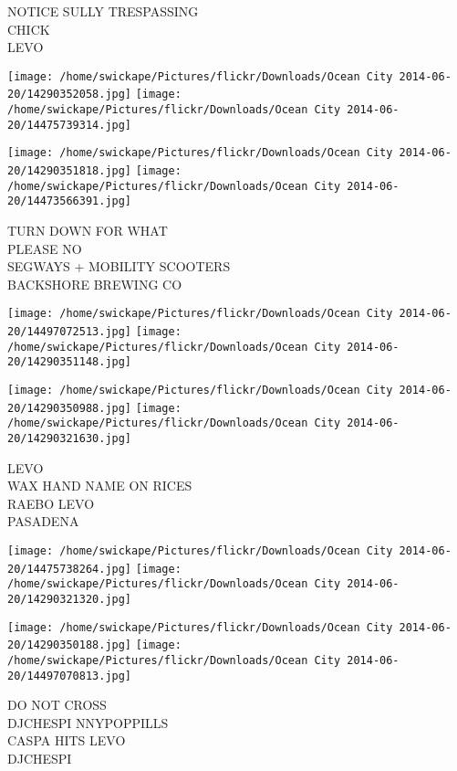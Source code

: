 \documentclass[10pt,letterpaper]{article}
\begin{document}
NOTICE SULLY TRESPASSING\\
CHICK\\
LEVO\\
\pagebreak

\texttt{[image: /home/swickape/Pictures/flickr/Downloads/Ocean City 2014-06-20/14290352058.jpg]}
\texttt{[image: /home/swickape/Pictures/flickr/Downloads/Ocean City 2014-06-20/14475739314.jpg]}

\texttt{[image: /home/swickape/Pictures/flickr/Downloads/Ocean City 2014-06-20/14290351818.jpg]}
\texttt{[image: /home/swickape/Pictures/flickr/Downloads/Ocean City 2014-06-20/14473566391.jpg]}

TURN DOWN FOR WHAT\\
PLEASE NO\\
SEGWAYS + MOBILITY SCOOTERS\\
BACKSHORE BREWING CO\\
\pagebreak

\texttt{[image: /home/swickape/Pictures/flickr/Downloads/Ocean City 2014-06-20/14497072513.jpg]}
\texttt{[image: /home/swickape/Pictures/flickr/Downloads/Ocean City 2014-06-20/14290351148.jpg]}

\texttt{[image: /home/swickape/Pictures/flickr/Downloads/Ocean City 2014-06-20/14290350988.jpg]}
\texttt{[image: /home/swickape/Pictures/flickr/Downloads/Ocean City 2014-06-20/14290321630.jpg]}

LEVO\\
WAX HAND NAME ON RICES\\
RAEBO LEVO\\
PASADENA\\
\pagebreak

\texttt{[image: /home/swickape/Pictures/flickr/Downloads/Ocean City 2014-06-20/14475738264.jpg]}
\texttt{[image: /home/swickape/Pictures/flickr/Downloads/Ocean City 2014-06-20/14290321320.jpg]}

\texttt{[image: /home/swickape/Pictures/flickr/Downloads/Ocean City 2014-06-20/14290350188.jpg]}
\texttt{[image: /home/swickape/Pictures/flickr/Downloads/Ocean City 2014-06-20/14497070813.jpg]}

DO NOT CROSS\\
DJCHESPI NNYPOPPILLS\\
CASPA HITS LEVO\\
DJCHESPI\\
\pagebreak
\end{document}
